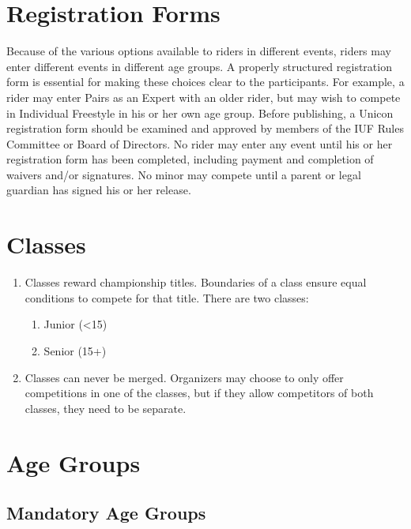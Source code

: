 \section{Registration Forms}
Because of the various options available to riders in different events, riders may enter different events in different age groups.
A properly structured registration form is essential for making these choices clear to the participants.
For example, a rider may enter Pairs as an Expert with an older rider, but may wish to compete in Individual Freestyle in his or her own age group.
Before publishing, a Unicon registration form should be examined and approved by members of the IUF Rules Committee or Board of Directors.
No rider may enter any event until his or her registration form has been completed, including payment and completion of waivers and/or signatures.
No minor may compete until a parent or legal guardian has signed his or her release.

\section{Classes}\label{subsec:general_classes}

\begin{enumerate}[leftmargin=1.5em,labelsep=*]
	\item Classes reward championship titles.
	Boundaries of a class ensure equal conditions to compete for that title.
	There are two classes:
	\begin{enumerate}[label=\Roman*,leftmargin=1.75em,labelsep=0.5em]
		\item Junior (<15)
		\item Senior (15+)
	\end{enumerate}
	\item Classes can never be merged.
	Organizers may choose to only offer competitions in one of the classes, but if they allow competitors of both classes, they need to be separate.
\end{enumerate}

\section{Age Groups}\label{subsec:general_age_groups}

\subsection{Mandatory Age Groups}

